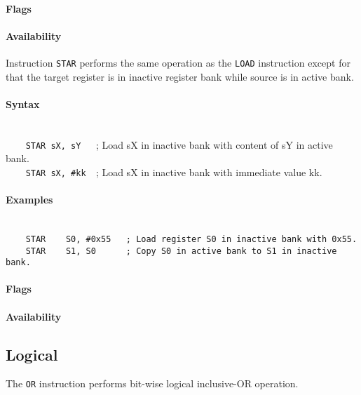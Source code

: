         \paragraph{Flags}

        \paragraph{Availability}
            \pbavailability{\yes}{\yes}{\yes}{\yes}{\yes}

    \clearpage
        Instruction \texttt{STAR} performs the same operation as the \texttt{LOAD} instruction except for that the target register is in inactive register bank while source is in active bank.

        \paragraph{Syntax}
            ~\\
            \verb'    STAR sX, sY   '; Load sX in inactive bank with content of sY in active bank.\\
            \verb'    STAR sX, #kk  '; Load sX in inactive bank with immediate value kk.

        \paragraph{Examples}
            ~\\
            \verb'    STAR    S0, #0x55   ; Load register S0 in inactive bank with 0x55.'\\
            \verb'    STAR    S1, S0      ; Copy S0 in active bank to S1 in inactive bank.'

        \paragraph{Flags}

        \paragraph{Availability}
            \pbavailability{\yes}{\no}{\no}{\no}{\no}

\clearpage
\subsection{Logical}
        The \texttt{OR} instruction performs bit-wise logical inclusive-OR operation.

